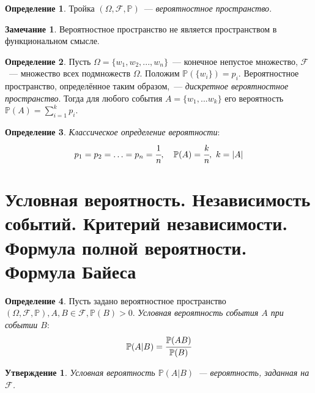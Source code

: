 \documentclass[oneside,final,14pt]{extreport}
\newcommand\myprob[1]{{\mathbb{P}(#1)}}
\theoremstyle{plain}
\newtheorem*{thm*}{Утверждение}
\theoremstyle{definition}
\newtheorem*{defn}{Определение}
\newtheorem*{rmrk}{Замечание}
\theoremstyle{named}
\begin{document}
\begin{defn}
    Тройка $(\Omega, \mathcal{F}, \mathbb{P})$~--- {\it вероятностное пространство}.
\end{defn}
\begin{rmrk}
    Вероятностное пространство не является пространством в функциональном смысле.
\end{rmrk}

\begin{defn}
    Пусть $\Omega = \{ w_1, w_2,..., w_n\}$~--- конечное непустое множество, $\mathcal{F}$~--- множество всех подмножеств $\Omega$. Положим $\myprob{\{w_i\}} = p_i$. Вероятностное пространство, определённое таким образом,~--- {\it дискретное вероятностное пространство}. Тогда для любого события $A = \{ w_1,...w_k\}$ его вероятность $\myprob{A} = \sum\limits_{i=1}^k p_i$.
\end{defn}

\begin{defn}
    {\it Классическое определение вероятности}:
    \begin{equation*}
        p_1 = p_2 = \ldots =p_n=\cfrac{1}{n}, \quad \myprob{A} = \cfrac{k}{n},~ k=|A|
    \end{equation*}
\end{defn}

\section {Условная вероятность. Независимость событий. Критерий независимости. Формула полной вероятности. Формула Байеса}

\begin{defn}
    Пусть задано вероятностное пространство $(\Omega, \mathcal{F}, \mathbb{P}), A, B \in \mathcal{F}, \myprob{B} > 0$. {\it Условная вероятность события $A$ при событии \(B\)}:
    \begin{equation*}
        \myprob{A|B}=\cfrac{\myprob{AB}}{\myprob{B}}
    \end{equation*}
\end{defn}

\begin{thm*}
    Условная вероятность $\myprob{A|B}$~--- вероятность, заданная на $\mathcal{F}$.
\end{thm*}
\end{document}
